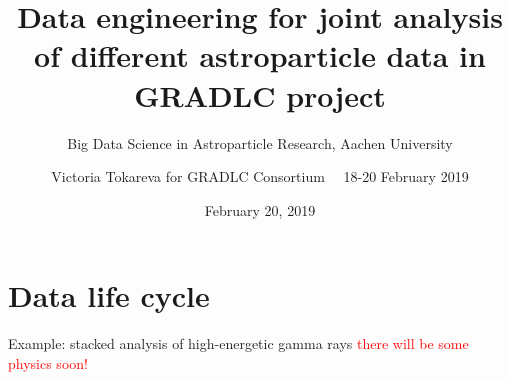 \documentclass[18pt]{beamer}
\title[Data engineering for astroparticle physics]{Data engineering for joint analysis of different astroparticle data in GRADLC project}
\subtitle{Big Data Science in Astroparticle Research, Aachen University}
\author[Victoria Tokareva]{
  Victoria Tokareva for GRADLC Consortium ~\textbar~18-20 February 2019
}
\institute{Institute for Nuclear Physics (IKP)}
\date{February 20, 2019}
\begin{document}



\section{Data life cycle}




\begin{frame}{Example: stacked analysis of high-energetic gamma rays}
 \textcolor{red}{there will be some physics soon!}
\end{frame}



% 
\end{document}

